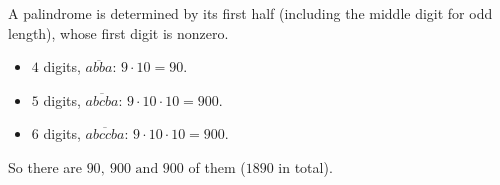 A palindrome is determined by its first half (including the middle digit for odd length), whose first digit is nonzero.
\begin{itemize}
\item $4$ digits, $\overline{abba}$: $9\cdot10=90$.
\item $5$ digits, $\overline{abcba}$: $9\cdot10\cdot10=900$.
\item $6$ digits, $\overline{abccba}$: $9\cdot10\cdot10=900$.
\end{itemize}
So there are $\boxed{90,\ 900\text{ and }900}$ of them ($1890$ in total).
